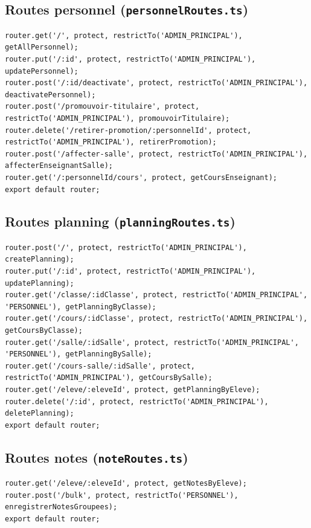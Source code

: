 \documentclass[12pt,a4paper]{article}
\begin{document}
\subsection{Routes personnel (\texttt{personnelRoutes.ts})}

\begin{lstlisting}[style=code]
router.get('/', protect, restrictTo('ADMIN_PRINCIPAL'), getAllPersonnel);
router.put('/:id', protect, restrictTo('ADMIN_PRINCIPAL'), updatePersonnel);
router.post('/:id/deactivate', protect, restrictTo('ADMIN_PRINCIPAL'), deactivatePersonnel);
router.post('/promouvoir-titulaire', protect, restrictTo('ADMIN_PRINCIPAL'), promouvoirTitulaire);
router.delete('/retirer-promotion/:personnelId', protect, restrictTo('ADMIN_PRINCIPAL'), retirerPromotion);
router.post('/affecter-salle', protect, restrictTo('ADMIN_PRINCIPAL'), affecterEnseignantSalle);
router.get('/:personnelId/cours', protect, getCoursEnseignant);
export default router;
\end{lstlisting}

\subsection{Routes planning (\texttt{planningRoutes.ts})}

\begin{lstlisting}[style=code]
router.post('/', protect, restrictTo('ADMIN_PRINCIPAL'), createPlanning);
router.put('/:id', protect, restrictTo('ADMIN_PRINCIPAL'), updatePlanning);
router.get('/classe/:idClasse', protect, restrictTo('ADMIN_PRINCIPAL', 'PERSONNEL'), getPlanningByClasse);
router.get('/cours/:idClasse', protect, restrictTo('ADMIN_PRINCIPAL'), getCoursByClasse);
router.get('/salle/:idSalle', protect, restrictTo('ADMIN_PRINCIPAL', 'PERSONNEL'), getPlanningBySalle);
router.get('/cours-salle/:idSalle', protect, restrictTo('ADMIN_PRINCIPAL'), getCoursBySalle);
router.get('/eleve/:eleveId', protect, getPlanningByEleve);
router.delete('/:id', protect, restrictTo('ADMIN_PRINCIPAL'), deletePlanning);
export default router;
\end{lstlisting}

\subsection{Routes notes (\texttt{noteRoutes.ts})}

\begin{lstlisting}[style=code]
router.get('/eleve/:eleveId', protect, getNotesByEleve);
router.post('/bulk', protect, restrictTo('PERSONNEL'), enregistrerNotesGroupees);
export default router;
\end{lstlisting}
\end{document}
